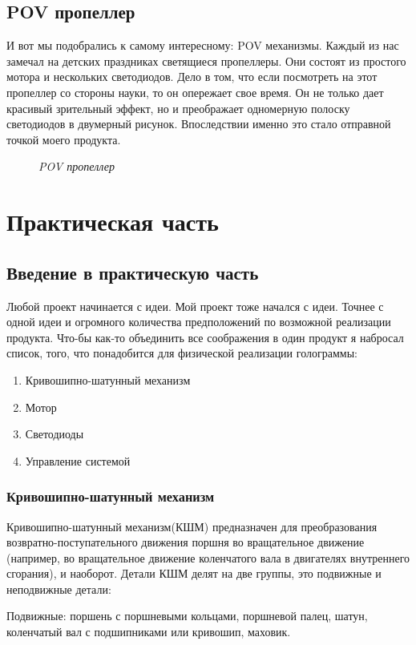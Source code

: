 \documentclass[a4paper, 12pt]{article}
\newcommand{\image}[3]{
	\begin{figure}[ht]
		\center{\texttt{[image: img/\#1]} }
		\caption{\textit{#3}}\end{figure}
}
\begin{document}
\subsection{POV пропеллер}

И вот мы подобрались к самому интересному: POV механизмы. Каждый
из нас замечал на детских праздниках светящиеся пропеллеры. Они состоят
из простого мотора и нескольких светодиодов. Дело в том, что если
посмотреть на этот пропеллер со стороны науки, то он опережает свое время.
Он не только дает красивый зрительный эффект, но и преображает
одномерную полоску светодиодов в двумерный рисунок. Впоследствии
именно это стало отправной точкой моего продукта.

\image{пропеллер.jpg}{300}{POV пропеллер}

\newpage

\section{Практическая часть}
\subsection{Введение в практическую часть}

Любой проект начинается с идеи. Мой проект тоже начался с идеи.
Точнее с одной идеи и огромного количества предположений по возможной реализации продукта.
Что-бы как-то объединить все соображения в один продукт я набросал список, того,
что понадобится для физической реализации голограммы:
\begin{enumerate}
	\item Кривошипно-шатунный механизм
	\item Мотор
	\item Светодиоды
	\item Управление системой
\end{enumerate}
\subsubsection{Кривошипно-шатунный механизм}

Кривошипно-шатунный механизм(КШМ) предназначен для преобразования
возвратно-поступательного движения поршня во вращательное движение
(например, во вращательное движение коленчатого вала в двигателях
внутреннего сгорания), и наоборот. Детали КШМ делят на две
группы, это подвижные и неподвижные детали:

Подвижные: поршень с поршневыми кольцами, поршневой палец,
шатун, коленчатый вал с подшипниками или кривошип, маховик.
\end{document}
